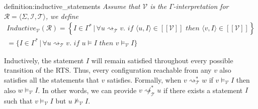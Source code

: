 \begin{theo}{definition:inductive_statements}
    \textit{
        Assume that $\mathcal{V}$ is the $\Gamma$-\textit{interpretation} for $\mathcal{R} = \langle \Sigma, \mathcal{I}, \mathcal{T} \rangle$, we define
    }
    \begin{gather*}
        Inductive_{\mathcal{V}}(\mathcal{R}) = \left\lbrace I \in \Gamma^* \, | \,
        \forall u \rightsquigarrow_\mathcal{T} v. \,\, if \,\, \langle u, I \rangle
        \in [[\mathcal{V}]] \,\, then \,\, \langle v, I \rangle \in [[\mathcal{V}]] \right\rbrace \\
        =  \lbrace I \in \Gamma^* \, |  \,
        \forall u \rightsquigarrow_\mathcal{T} v. \,\, if \,\, u \models I
            \,\, then \,\, v \models_{\mathcal{V}} I \rbrace
    \end{gather*}
\end{theo}
Inductively, the statement $I$ will remain satisfied throughout every possible transition of the RTS.
Thus, every configuration reachable from any $v$ also satisfies all the statements that $v$ satisfies.
Formally, when $v \rightsquigarrow_\mathcal{T}^* w$ if $v \models_{\mathcal{V}} I$ then also $w \models_{\mathcal{V}} I$.
In other words, we can provide $v \not\rightsquigarrow_\mathcal{T}^* u$ if there exists a statement $I$ such that
$v \models_{\mathcal{V}} I$ but $u \not\models_{\mathcal{V}} I$.

